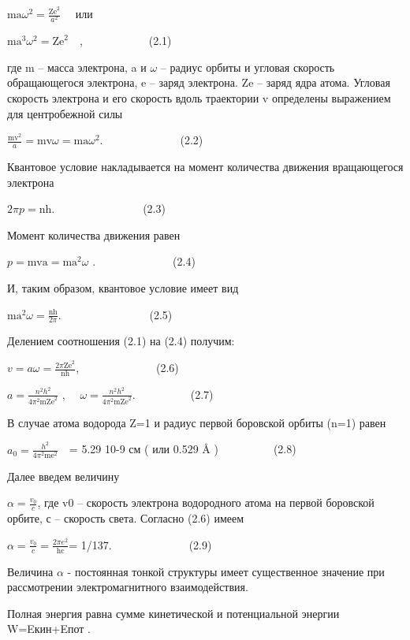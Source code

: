 \documentclass[a4paper,14pt, openany, twoside, draft]{extbook} %
\begin{document}
 ${\text{ma}}\omega ^2=\frac{{\text{Ze}}^2}{a^2}$ \ \ или \ \ \ \ \ \ \ \ \ \ \ \

 ${\text{ma}}^3\omega ^2={\text{Ze}}^2$\ \ ,\ \ \ \ \ \ \ \ \ \ \ \ (2.1)

где m – масса электрона, a и ${\omega}$ – радиус орбиты и угловая скорость обращающегося электрона, e – заряд электрона. Ze – заряд ядра атома. Угловая скорость электрона и его скорость  вдоль траектории v определены выражением для центробежной силы

 $\frac{{\text{mv}}^2} a={\text{mv}}\omega ={\text{ma}}\omega ^2$.\ \ \ \ \ \ \ \ \ \ \ \ \ \ (2.2)

Квантовое условие накладывается на момент количества движения вращающегося электрона

 $2\mathit{\pi p}={\text{nh}}$.\ \ \ \ \ \ \ \ \ \ \ \ \ \ \ \ (2.3)

Момент количества движения равен

 $p={\text{mva}}={\text{ma}}^2\omega $ .\ \ \ \ \ \ \ \ \ \ \ \ \ \ (2.4)

И, таким образом, квантовое условие имеет вид

 ${\text{ma}}^2\omega =\frac{{\text{nh}}}{2\pi }$.\ \ \ \ \ \ \ \ \ \ \ \ \ \ \ \ (2.5)

Делением соотношения (2.1) на (2.4) получим:

 $v=\mathit{a\omega }=\frac{2\pi {\text{Ze}}^2}{{\text{nh}}}$,\ \ \ \ \ \ \ \ \ \ \ \ \ \ (2.6)

 $a=\frac{n^2h^2}{4\pi ^2{\text{mZe}}^2}$ , \ \  $\omega =\frac{n^2h^2}{4\pi ^2{\text{mZe}}^2}$.\ \ \ \ \ \ \ \ \ \ (2.7)

В случае атома водорода Z=1 и радиус первой боровской орбиты (n=1) равен

 $a_0=\frac{h^2}{4\pi ^2{\text{me}}^2}$\ \ = 5.29 10{}-9 см ( или 0.529 Å )\ \ \ \ \ \ \ \ \ \ (2.8)

Далее введем величину

 $\alpha =\frac{v_0} c$, где v0 – скорость электрона водородного атома на первой боровской орбите, с – скорость света. Согласно (2.6) имеем

 $\alpha =\frac{v_0} c=\frac{2\mathit{\pi e}^2}{{\text{hc}}}$= 1/137.\ \ \ \ \ \ \ \ \ \ \ \ \ \ (2.9)

Величина ${\alpha}$ -  постоянная тонкой структуры имеет существенное значение при рассмотрении электромагнитного взаимодействия.

Полная энергия равна сумме кинетической и потенциальной энергии W=Eкин+Eпот .
\end{document}
